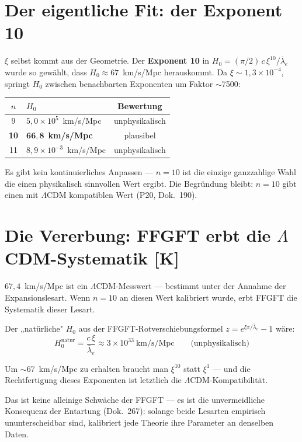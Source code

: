 \documentclass[11pt]{report}
\begin{document}
\section{Der eigentliche Fit: der Exponent 10}

$\xi$ selbst kommt aus der Geometrie. Der \textbf{Exponent 10} in
$H_0 = (\pi/2)\,c\,\xi^{10}/\bar\lambda_e$ wurde so gewählt, dass
$H_0 \approx 67$~km/s/Mpc herauskommt. Da $\xi \sim 1{,}3\times10^{-4}$,
springt $H_0$ zwischen benachbarten Exponenten um Faktor $\sim$7500:

\begin{center}
\begin{tabular}{clc}
\toprule
$n$ & $H_0$ & Bewertung \\
\midrule
9  & $5{,}0\times10^5$~km/s/Mpc & unphysikalisch \\
\textbf{10} & $\mathbf{66{,}8}$~\textbf{km/s/Mpc} & plausibel \\
11 & $8{,}9\times10^{-3}$~km/s/Mpc & unphysikalisch \\
\bottomrule
\end{tabular}
\end{center}

Es gibt kein kontinuierliches Anpassen — $n=10$ ist die einzige
ganzzahlige Wahl die einen physikalisch sinnvollen Wert ergibt.
Die Begründung bleibt: $n=10$ gibt einen mit $\Lambda$CDM
kompatiblen Wert (P20, Dok.~190).

\section{Die Vererbung: FFGFT erbt die $\Lambda$CDM-Systematik [K]}

$67{,}4$~km/s/Mpc ist ein $\Lambda$CDM-Messwert — bestimmt unter
der Annahme der Expansionslesart. Wenn $n=10$ an diesen Wert
kalibriert wurde, erbt FFGFT die Systematik dieser Lesart.

Der „natürliche" $H_0$ aus der FFGFT-Rotverschiebungsformel
$z = e^{\xi x/\bar\lambda_e} - 1$ wäre:
\[
  H_0^\text{natur} = \frac{c\,\xi}{\bar\lambda_e}
  \approx 3\times10^{33}~\text{km/s/Mpc}
  \qquad\text{(unphysikalisch)}
\]

Um $\sim$67~km/s/Mpc zu erhalten braucht man $\xi^{10}$ statt $\xi^1$ —
und die Rechtfertigung dieses Exponenten ist letztlich die
$\Lambda$CDM-Kompatibilität.

Das ist keine alleinige Schwäche der FFGFT — es ist die unvermeidliche
Konsequenz der Entartung (Dok.~267): solange beide Lesarten empirisch
ununterscheidbar sind, kalibriert jede Theorie ihre Parameter an
denselben Daten.
\end{document}
